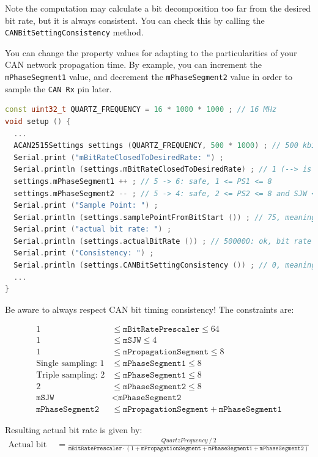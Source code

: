 \documentclass[10pt, a4paper, obeyspaces]{extarticle}
\begin{document}
Note the computation may calculate a bit decomposition too far from the desired bit rate, but it is always consistent. You can check this by calling the \texttt{CANBitSettingConsistency} method.

You can change the property values for adapting to the particularities of your CAN network propagation time. By example, you can increment the \texttt{mPhaseSegment1} value, and decrement the \texttt{mPhaseSegment2} value in order to sample the \texttt{CAN Rx} pin later.

{ \small\begin{lstlisting}[language=c++]
const uint32_t QUARTZ_FREQUENCY = 16 * 1000 * 1000 ; // 16 MHz
void setup () {
  ...
  ACAN2515Settings settings (QUARTZ_FREQUENCY, 500 * 1000) ; // 500 kbit/s
  Serial.print ("mBitRateClosedToDesiredRate: ") ;
  Serial.println (settings.mBitRateClosedToDesiredRate) ; // 1 (--> is true)
  settings.mPhaseSegment1 ++ ; // 5 -> 6: safe, 1 <= PS1 <= 8
  settings.mPhaseSegment2 -- ; // 5 -> 4: safe, 2 <= PS2 <= 8 and SJW <= PS2
  Serial.print ("Sample Point: ") ;
  Serial.println (settings.samplePointFromBitStart ()) ; // 75, meaning 75%
  Serial.print ("actual bit rate: ") ;
  Serial.println (settings.actualBitRate ()) ; // 500000: ok, bit rate did not change
  Serial.print ("Consistency: ") ;
  Serial.println (settings.CANBitSettingConsistency ()) ; // 0, meaning Ok
  ...
}
\end{lstlisting}}

Be aware to always respect CAN bit timing consistency! The constraints are:

\begin{align*}
1 & \leqslant \texttt{mBitRatePrescaler} \leqslant 64 \\
1 & \leqslant \texttt{mSJW} \leqslant 4 \\
1 & \leqslant \texttt{mPropagationSegment} \leqslant 8 \\
\text{Single sampling: }1 & \leqslant \texttt{mPhaseSegment1} \leqslant 8\\
\text{Triple sampling: }2 & \leqslant \texttt{mPhaseSegment1} \leqslant 8\\
2 & \leqslant \texttt{mPhaseSegment2} \leqslant 8 \\
\texttt{mSJW} &<\texttt{mPhaseSegment2}\\
\texttt{mPhaseSegment2} & \leqslant \texttt{mPropagationSegment} + \texttt{mPhaseSegment1}
\end{align*}

Resulting actual bit rate is given by:
{\small
\begin{align*}
\text{Actual bit rate} & = \frac{QuartzFrequency~/~2}{\texttt{mBitRatePrescaler} \cdot (1 + \texttt{mPropagationSegment} + \texttt{mPhaseSegment1} + \texttt{mPhaseSegment2})}
\end{align*}
}
\end{document}
